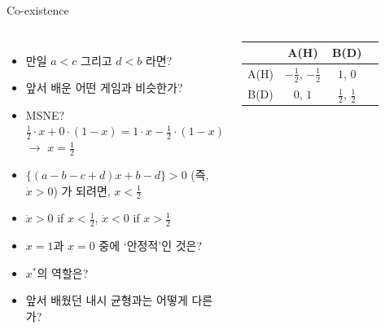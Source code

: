 \documentclass[final]{beamer}
\begin{document}
\begin{frame}[t]{Co-existence}
	\begin{columns}[c]
		\column{17em}
		\small
		\begin{itemize}
		\item 만일 $a<c$ 그리고 $d<b$ 라면?
		\item 앞서 배운 어떤 게임과 비슷한가? 
		\item MSNE? $\frac{1}{2} \cdot x + 0 \cdot (1-x) = 1 \cdot x - \frac{1}{2} \cdot (1 - x)$ $\rightarrow$ 
		$x = \frac{1}{2}$
		\item $\{(a-b-c+d)x + b-d \} > 0$ (즉, $\dot{x} > 0$) 가 되려면, $x < \frac{1}{2}$
		\item $\dot{x} > 0$ if $x < \frac{1}{2}$, $\dot{x} < 0$ if $x > \frac{1}{2}$
		\item $x=1$과 $x=0$ 중에 `안정적'인 것은?
		\item $x^*$의 역할은?
		\item 앞서 배웠던 내시 균형과는 어떻게 다른가? 
		\end{itemize}
		\column{14em}
		\hspace{-1em}
		\begin{table}
		\setlength{\tabcolsep}{1.2em}
		\begin{tabular}{|c|c|c|c|} \hline
		&  {A(H)} & {B(D)} \\ \hline
		{A(H)} & {$-\frac{1}{2}$}, {$-\frac{1}{2}$} & {$1$}, {$0$} \\ \hline%
		{B(D)} & {$0$}, {$1$} & {$\frac{1}{2}$}, {$
		\frac{1}{2}$}\\ 
		\hline
		\end{tabular}
		\end{table}
	\end{columns}
\end{frame}
\end{document}
